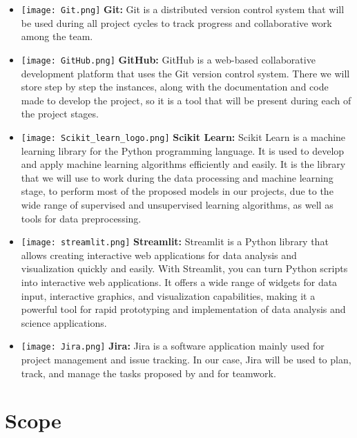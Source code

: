 \documentclass[12pt]{article}
\begin{document}
\begin{itemize}
    \item \texttt{[image: Git.png]}
    \textbf{Git:} Git is a distributed version control system that will be used during all project cycles to track progress and collaborative work among the team.
    
    \item \texttt{[image: GitHub.png]}
    \textbf{GitHub:} GitHub is a web-based collaborative development platform that uses the Git version control system. There we will store step by step the instances, along with the documentation and code made to develop the project, so it is a tool that will be present during each of the project stages.
    
    \item \texttt{[image: Scikit\_learn\_logo.png]}
    \textbf{Scikit Learn:} Scikit Learn is a machine learning library for the Python programming language. It is used to develop and apply machine learning algorithms efficiently and easily. It is the library that we will use to work during the data processing and machine learning stage, to perform most of the proposed models in our projects, due to the wide range of supervised and unsupervised learning algorithms, as well as tools for data preprocessing.
    
    \item \texttt{[image: streamlit.png]}
    \textbf{Streamlit:} Streamlit is a Python library that allows creating interactive web applications for data analysis and visualization quickly and easily. With Streamlit, you can turn Python scripts into interactive web applications. It offers a wide range of widgets for data input, interactive graphics, and visualization capabilities, making it a powerful tool for rapid prototyping and implementation of data analysis and science applications.
    
    \item \texttt{[image: Jira.png]}
    \textbf{Jira:} Jira is a software application mainly used for project management and issue tracking. In our case, Jira will be used to plan, track, and manage the tasks proposed by and for teamwork.
\end{itemize}

\section{Scope}
\end{document}
